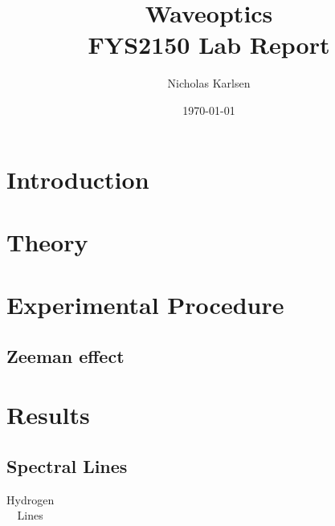 \documentclass[11pt,a4paper]{article}
\begin{document}

\title{Waveoptics\\
\normalsize{FYS2150 Lab Report}}

\author{Nicholas Karlsen}

\date{\today}%

\maketitle

\begin{abstract}
\end{abstract}


\section{\label{sect:intro}Introduction}

\section{\label{sect:theory}Theory}

\section{\label{section:experimental}Experimental Procedure} 
   
    \subsection{Zeeman effect}

\section{\label{sect:results}Results}
    \subsection{\label{subsect:spectral}Spectral Lines}
    
    \begin{table}[H]
        \center
        \caption{Hydrogen Lines}
        \begin{tabular}{ l l l l}
        
        \end{tabular}
        \label{tab:hydrogen}
    \end{table}
\end{document}
